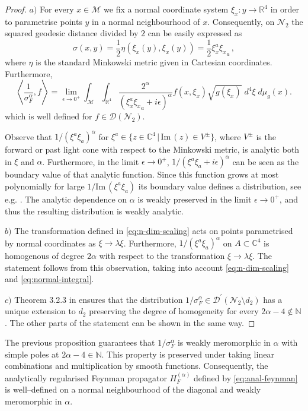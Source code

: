 \documentclass[a4paper,10pt,twoside]{article}
\numberwithin{equation}{section}
\newcounter{and}
\def\bbN{\mathbb{N}}
\def\M{\mathcal{M}}
\def\N{\mathcal{N}}
\def\D{\mathcal{D}}
\def\Imm{\mathrm{Im}\,}
\theoremstyle{plain}
\theoremstyle{definition}
\begin{document}
\begin{proof}
$a)$ For every $x \in \M$ we fix a normal coordinate system $\xi_x:y\to{\mathbb{R}^4}$ in order to parametrise points $y$ in a normal neighbourhood of $x$. Consequently, on $\N_2$ the squared geodesic distance divided by $2$ can be easily expressed as
\[
\sigma(x,y)= \frac{1}{2}\eta(\xi_x(y),\xi_x(y)) = \frac{1}{2}\xi_x^{a}{\xi_x}_{a}\,,
\]
where $\eta$ is the standard Minkowski metric given in Cartesian coordinates. Furthermore, 
\begin{equation}\label{eq:normal-integral}
\left\langle \frac{1}{\sigma^\alpha_F}, f \right\rangle = 
\lim_{\epsilon\to0^+ } \int_\M \int_{\mathbb{R}^4}  \frac{2^{\alpha}}{(\xi_x^a{\xi_{x}}_a+i\epsilon)^{\alpha}} f(x,\xi_x) \sqrt{g(\xi_x)}\; d^4\xi\; d\mu_g (x).
\end{equation}
which is well defined for $f\in\D(\N_2)$. 

Observe that $1/(\xi^{a}{\xi}_{a})^\alpha$  for $\xi^{a}\in \{z\in \mathbb{C}^4 \,|\,\Imm(z) \in V^\pm \}$, where $V^\pm$ is the forward or past light cone with respect to the Minkowski metric, is  analytic both in $\xi$ and $\alpha$.  Furthermore, in the limit $\epsilon\to0^+$,  $1/(\xi^{a}{\xi}_{a} + i \epsilon)^\alpha$ can be seen as the boundary value of that analytic function. Since this function grows at most polynomially for large $1/\Imm(\xi^a\xi_a)$ its boundary value defines a distribution, see e.g. \cite[Theorem 3.1.15]{Hormander}. The analytic dependence on $\alpha$ is weakly preserved in the limit $\epsilon\to0^+$, and thus the resulting distribution is weakly analytic.

$b)$  The transformation defined in \eqref{eq:n-dim-scaling} acts on points parametrised by normal coordinates as $\xi \to \lambda \xi $. Furthermore, $1/(\xi^{a}{\xi}_{a})^\alpha$ on $A \subset \mathbb{C}^4$ is homogenous of degree $2\alpha$ with respect to the transformation $\xi\to \lambda \xi$. The statement follows from this observation, taking into account \eqref{eq:n-dim-scaling} and \eqref{eq:normal-integral}.

$c)$ Theorem 3.2.3 in \cite{Hormander} ensures that the distribution $1/{\sigma^\alpha_F}\in\D^\prime(\N_2\setminus d_2)$ has a unique extension to $d_2$ preserving the degree of homogeneity for every $2\alpha-4 \notin \bbN$. The other parts of the statement can be shown in the same way.
\end{proof}

The previous proposition guarantees that $1/\sigma_F^{\alpha}$ is weakly meromorphic in $\alpha$ with simple poles at $2\alpha-4\in\bbN$. This property is preserved under taking linear combinations and multiplication by smooth functions. Consequently, the analytically regularised Feynman propagator $H^{(\alpha)}_F$ defined by \eqref{eq:anal-feynman} is well--defined on a normal neighbourhood of the diagonal and weakly meromorphic in $\alpha$.
\end{document}
